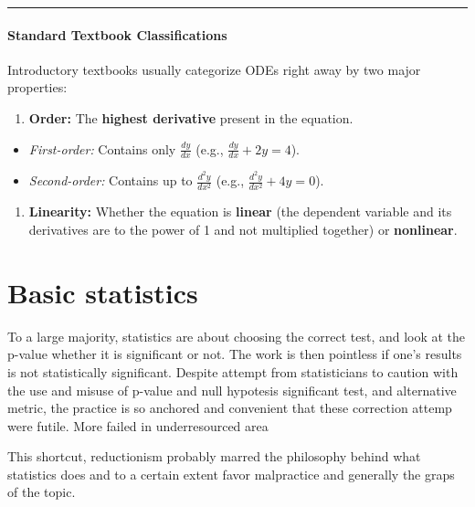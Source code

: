 \documentclass[
  letterpaper,
  DIV=11,
  numbers=noendperiod]{scrreprt}
\providecommand{\tightlist}{%
  \setlength{\itemsep}{0pt}\setlength{\parskip}{0pt}}
\begin{document}
\begin{center}\rule{0.5\linewidth}{0.5pt}\end{center}

\subsection{Standard Textbook
Classifications}\label{standard-textbook-classifications}

Introductory textbooks usually categorize ODEs right away by two major
properties:

\begin{enumerate}
\def\labelenumi{\arabic{enumi}.}
\tightlist
\item
  \textbf{Order:} The \textbf{highest derivative} present in the
  equation.
\end{enumerate}

\begin{itemize}
\tightlist
\item
  \emph{First-order:} Contains only \(\frac{dy}{dx}\) (e.g.,
  \(\frac{dy}{dx} + 2y = 4\)).
\item
  \emph{Second-order:} Contains up to \(\frac{d^2y}{dx^2}\) (e.g.,
  \(\frac{d^2y}{dx^2} + 4y = 0\)).
\end{itemize}

\begin{enumerate}
\def\labelenumi{\arabic{enumi}.}
\setcounter{enumi}{1}
\tightlist
\item
  \textbf{Linearity:} Whether the equation is \textbf{linear} (the
  dependent variable and its derivatives are to the power of 1 and not
  multiplied together) or \textbf{nonlinear}.
\end{enumerate}

\part{Basic statistics}

To a large majority, statistics are about choosing the correct test, and
look at the p-value whether it is significant or not. The work is then
pointless if one's results is not statistically significant. Despite
attempt from statisticians to caution with the use and misuse of p-value
and null hypotesis significant test, and alternative metric, the
practice is so anchored and convenient that these correction attemp were
futile. More failed in underresourced area

This shortcut, reductionism probably marred the philosophy behind what
statistics does and to a certain extent favor malpractice and generally
the graps of the topic.
\end{document}
